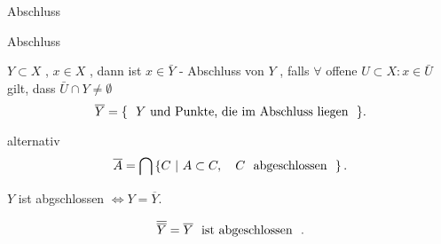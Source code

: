 \documentclass[class=article, crop=false]{standalone}
\begin{document}
\begin{zettel}{Abschluss}
\begin{flashcard}[c74k7a41]{Abschluss}
	\begin{definition}[Abschluss]
		$Y \subset X$ , $x \in  X$ , dann ist $x \in  \bar{Y} $ - Abschluss von $Y$ , falls  $\forall $ offene $U \subset X : x \in  \bar{U} $ gilt, dass $ \bar{U} \cap Y \neq  \emptyset$
		\[
			\bar{Y} =  \set{ \tx{ $Y$ und Punkte, die im Abschluss liegen } }
		.\]
	\end{definition}
\end{flashcard}

alternativ
\[
	\bar{A} = \bigcap \set{C}{A \subset C,\quad C  \tx{ abgeschlossen } }
.\]
\begin{lemma}
	$Y$ ist abgschlossen $\iff Y =\overline{Y} $.
\end{lemma}

\begin{corollary}
	\[
		\overline{\overline{Y}} = \overline{Y} \tx{ ist abgeschlossen }
	.\]
\end{corollary}
\end{zettel}
\end{document}
